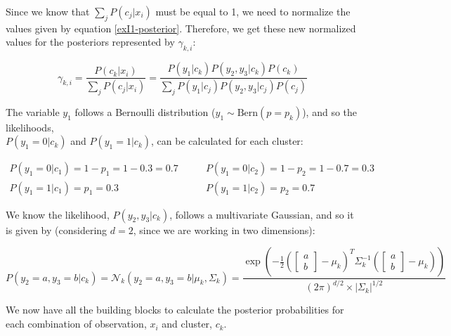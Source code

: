 \documentclass[12pt]{article}
\begin{document}
\begin{enumerate}[leftmargin=\labelsep]
          Since we know that $\sum_j P(c_j|x_i)$ must be equal to 1, we need to normalize the values given by equation \eqref{exI1-posterior}.
          Therefore, we get these new normalized values for the posteriors represented by $\gamma_{k,i}$:

          \begin{equation}\label{exI1-gamma}
              \gamma_{k,i} = \frac{P(c_k | x_i)}{\sum_j P(c_j | x_i)}
                           = \frac{P(y_1|c_k)P(y_2,y_3|c_k)P(c_k)}{\sum_j P(y_1|c_j)P(y_2,y_3|c_j)P(c_j)}
          \end{equation}

          The variable $y_1$ follows a Bernoulli distribution ($y_1 \sim \text{Bern}\left(p=p_k\right)$), and so the likelihoods,\\
          $P(y_1=0|c_k)$ and $P(y_1=1|c_k)$, can be calculated for each cluster:

          \vskip -0.4cm
          \begin{align*}
              P(y_1 = 0 | c_1) = 1 - p_1 = 1 - 0.3 = 0.7 & \qquad P(y_1 = 0 | c_2) = 1 - p_2 = 1 - 0.7 = 0.3 \\
              P(y_1 = 1 | c_1) = p_1 = 0.3               & \qquad P(y_1 = 1 | c_2) = p_2 = 0.7
          \end{align*}

          We know the likelihood, $P(y_2,y_3|c_k)$, follows a multivariate Gaussian, and so it is given by
          (considering $d = 2$, since we are working in two dimensions):

          \vskip -0.2cm
          \begin{equation}\label{exI1-likelihood-multivariate}
              P(y_2=a,y_3=b|c_k) = \mathcal{N}_k(y_2=a,y_3=b|\mu_k, \Sigma_k)
              = \frac{
              \exp\left(-\frac{1}{2} \left(\begin{bmatrix} a \\ b \end{bmatrix} - \mu_k\right)^T
              \Sigma_k^{-1} \left(\begin{bmatrix} a \\ b \end{bmatrix} - \mu_k\right)\right)}{(2\pi)^{d/2} \times |\Sigma_k|^{1/2}}
          \end{equation}

          We now have all the building blocks to calculate the posterior probabilities
          for each combination of observation, $x_i$ and cluster, $c_k$.


\end{enumerate}
\end{document}
